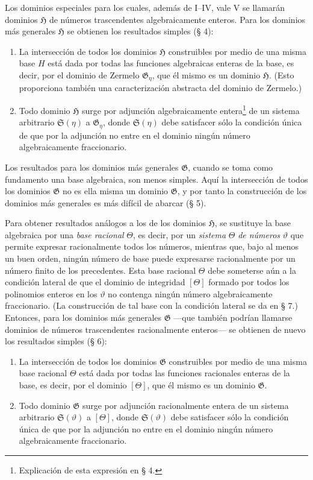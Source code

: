 \documentclass[11pt]{article}
\begin{document}
Los dominios especiales para los cuales, además de I--IV, vale V se llamarán dominios $\mathfrak H$ de números trascendentes algebraicamente enteros. Para los dominios más generales $\mathfrak H$ se obtienen los resultados simples (§ 4):
\begin{enumerate}
\item[a)] La intersección de todos los dominios $\mathfrak H$ construibles por medio de una misma base $H$ está dada por todas las funciones algebraicas enteras de la base, es decir, por el dominio de Zermelo $\mathfrak G_\eta$, que él mismo es un dominio $\mathfrak H$. (Esto proporciona también una caracterización abstracta del dominio de Zermelo.)
\item[b)] Todo dominio $\mathfrak H$ surge por adjunción algebraicamente entera\footnote{Explicación de esta expresión en § 4.} de un sistema arbitrario $\mathfrak S(\eta)$ a $\mathfrak G_\eta$, donde $\mathfrak S(\eta)$ debe satisfacer sólo la condición única de que por la adjunción no entre en el dominio ningún número algebraicamente fraccionario.
\end{enumerate}

Los resultados para los dominios más generales $\mathfrak G$, cuando se toma como fundamento una base algebraica, son menos simples. Aquí la intersección de todos los dominios $\mathfrak G$ no es ella misma un dominio $\mathfrak G$, y por tanto la construcción de los dominios más generales es más difícil de abarcar (§ 5).

Para obtener resultados análogos a los de los dominios $\mathfrak H$, se sustituye la base algebraica por una \emph{base racional} $\Theta$, es decir, por un \emph{sistema} $\Theta$ \emph{de números} $\vartheta$ que permite expresar racionalmente todos los números, mientras que, bajo al menos un buen orden, ningún número de base puede expresarse racionalmente por un número finito de los precedentes. Esta base racional $\Theta$ debe someterse aún a la condición lateral de que el dominio de integridad $[\Theta]$ formado por todos los polinomios enteros en los $\vartheta$ no contenga ningún número algebraicamente fraccionario. (La construcción de tal base con la condición lateral se da en § 7.) Entonces, para los dominios más generales $\mathfrak G$ ---que también podrían llamarse dominios de números trascendentes racionalmente enteros--- se obtienen de nuevo los resultados simples (§ 6):
\begin{enumerate}
\item[a)] La intersección de todos los dominios $\mathfrak G$ construibles por medio de una misma base racional $\Theta$ está dada por todas las funciones racionales enteras de la base, es decir, por el dominio $[\Theta]$, que él mismo es un dominio $\mathfrak G$.
\item[b)] Todo dominio $\mathfrak G$ surge por adjunción racionalmente entera de un sistema arbitrario $\mathfrak S(\vartheta)$ a $[\Theta]$, donde $\mathfrak S(\vartheta)$ debe satisfacer sólo la condición única de que por la adjunción no entre en el dominio ningún número algebraicamente fraccionario.
\end{enumerate}
\end{document}
